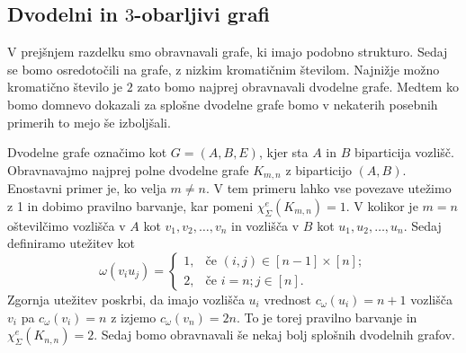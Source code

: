 \documentclass[12pt,a4paper,twoside]{article}
\theoremstyle{definition} %
\theoremstyle{plain} %
\newcommand{\ec}{\chi_{\Sigma}^e}
\numberwithin{equation}{section}  %
\begin{document}
 \subsection{Dvodelni in $3$-obarljivi grafi}
V prejšnjem razdelku smo obravnavali grafe, ki imajo podobno strukturo. Sedaj se bomo osredotočili na grafe, z nizkim kromatičnim številom. Najnižje možno kromatično število je $2$ zato bomo najprej obravnavali dvodelne grafe. Medtem ko bomo domnevo dokazali za splošne dvodelne grafe bomo v nekaterih posebnih primerih to mejo še izboljšali.

 
 Dvodelne grafe označimo kot $G=(A, B, E)$, kjer sta $A$ in $B$ biparticija vozlišč.
Obravnavajmo najprej polne dvodelne grafe $K_{m,n}$ z biparticijo $(A, B)$. Enostavni primer je, ko velja $m \neq n$. V tem primeru lahko vse povezave utežimo z 1 in dobimo pravilno barvanje, kar pomeni $\ec(K_{m,n}) = 1$. V kolikor je $m=n$ oštevilčimo vozlišča v $A$ kot $v_1, v_2, \ldots, v_n$ in vozlišča v $B$ kot $u_1, u_2, \ldots, u_n$. Sedaj definiramo utežitev kot
$$
\omega(v_i u_j) = 
\begin{cases}
1 , &\text {če } (i, j) \in [n-1] \times [n]; \\
2, & \text{če } i=n; j \in [n].
\end{cases}
$$
Zgornja utežitev poskrbi, da imajo vozlišča $u_i$ vrednost $c_{\omega}(u_i) =n + 1$ vozlišča $v_i$ pa $c_{\omega}(v_i) = n$ z izjemo $c_{\omega}(v_n) = 2n$. To je torej pravilno barvanje in $\ec(K_{n,n}) = 2$. Sedaj bomo obravnavali še nekaj bolj splošnih dvodelnih grafov.
\end{document}
